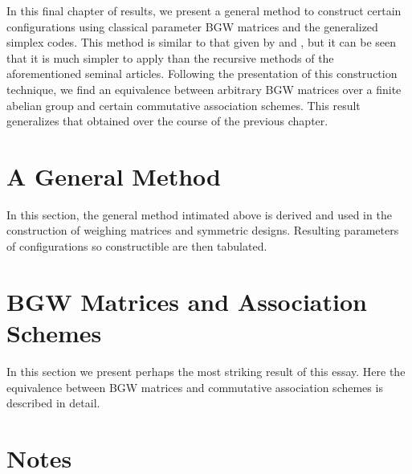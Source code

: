 \documentclass[../../main]{subfiles}
\begin{document}
In this final chapter of results, we present a general method \cite[see][]{w-mat-construct} to construct certain configurations using classical parameter BGW matrices and the generalized simplex codes. This method is similar to that given by \cite{rajkundlia} and \cite{ionin-bgw-bibd}, but it can be seen that it is much simpler to apply than the recursive methods of the aforementioned seminal articles. Following the presentation of this construction technique, we find an equivalence between arbitrary BGW matrices over a finite abelian group and certain commutative association schemes. This result generalizes that obtained over the course of the previous chapter.

 \section{\centering A General Method}
 
 In this section, the general method intimated above is derived and used in the construction of weighing matrices and symmetric designs. Resulting parameters of configurations so constructible are then tabulated.
 
 \dinkus
 
 
 
 \section{\centering BGW Matrices and Association Schemes}
 
 In this section we present perhaps the most striking result of this essay. Here the equivalence between BGW matrices and commutative association schemes is described in detail.
 
 \dinkus
 
 
 
 \singlespace
 
 \section*{\centering Notes}
 \thefnotes
 
 \doublespacing
 
 \biblio
\end{document}
